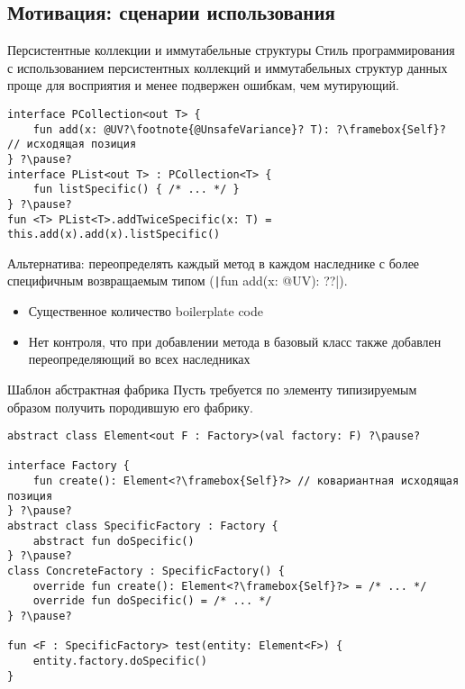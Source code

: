 \documentclass[handout,aspectratio=169,usenames,dvipsnames]{beamer}
\begin{document}
\subsection{Мотивация: сценарии использования}

\begin{frame}[fragile]{Персистентные коллекции и иммутабельные структуры}
    Стиль программирования с использованием персистентных коллекций и иммутабельных структур данных проще для восприятия и менее подвержен ошибкам, чем мутирующий.

    \begin{verbatim}
interface PCollection<out T> {
    fun add(x: @UV?\footnote{@UnsafeVariance}? T): ?\framebox{Self}? // исходящая позиция
} ?\pause?
interface PList<out T> : PCollection<T> {
    fun listSpecific() { /* ... */ }
} ?\pause?
fun <T> PList<T>.addTwiceSpecific(x: T) = this.add(x).add(x).listSpecific()
    \end{verbatim}

    \pause
    Альтернатива: переопределять каждый метод в каждом наследнике с более специфичным возвращаемым типом (\texttt|fun add(x: @UV): ??|).
    \begin{itemize}
        \item Существенное количество boilerplate code
        \item Нет контроля, что при добавлении метода в базовый класс также добавлен переопределяющий во всех наследниках
    \end{itemize}
\end{frame}

\begin{frame}[fragile]{Шаблон абстрактная фабрика}
    Пусть требуется по элементу типизируемым образом получить породившую его фабрику.

    \begin{verbatim}
abstract class Element<out F : Factory>(val factory: F) ?\pause?

interface Factory {
    fun create(): Element<?\framebox{Self}?> // ковариантная исходящая позиция
} ?\pause?
abstract class SpecificFactory : Factory {
    abstract fun doSpecific()
} ?\pause?
class ConcreteFactory : SpecificFactory() {
    override fun create(): Element<?\framebox{Self}?> = /* ... */
    override fun doSpecific() = /* ... */
} ?\pause?

fun <F : SpecificFactory> test(entity: Element<F>) {
    entity.factory.doSpecific()
}
    \end{verbatim}
\end{frame}
\end{document}
